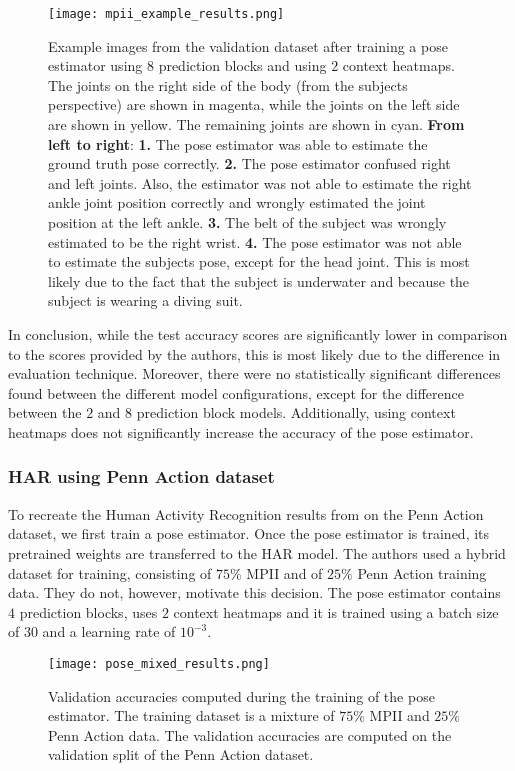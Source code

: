 \begin{figure}[htb!]
    \centering
    \texttt{[image: mpii\_example\_results.png]}
    \caption{Example images from the validation dataset after training a pose estimator using $8$ prediction blocks and using $2$ context heatmaps. The joints on the right side of the body (from the subjects perspective) are shown in magenta, while the joints on the left side are shown in yellow. The remaining joints are shown in cyan. \textbf{From left to right}: \textbf{1.} The pose estimator was able to estimate the ground truth pose correctly. \textbf{2.} The pose estimator confused right and left joints. Also, the estimator was not able to estimate the right ankle joint position correctly and wrongly estimated the joint position at the left ankle. \textbf{3.} The belt of the subject was wrongly estimated to be the right wrist. \textbf{4.} The pose estimator was not able to estimate the subjects pose, except for the head joint. This is most likely due to the fact that the subject is underwater and because the subject is wearing a diving suit.}
    \label{fig:mpii_example_results}
\end{figure}
In conclusion, while the test accuracy scores are significantly lower in comparison to the scores provided by the authors, this is most likely due to the difference in evaluation technique.
Moreover, there were no statistically significant differences found between the different model configurations, except for the difference between the $2$ and $8$ prediction block models.
Additionally, using context heatmaps does not significantly increase the accuracy of the pose estimator.

\subsubsection{HAR using Penn Action dataset}
\label{sec:exp-har-pennaction}
To recreate the Human Activity Recognition results from \cite{luvizon_2d/3d_2018} on the Penn Action dataset, we first train a pose estimator.
Once the pose estimator is trained, its pretrained weights are transferred to the HAR model.
The authors used a hybrid dataset for training, consisting of $75\%$ MPII and of $25\%$ Penn Action training data.
They do not, however, motivate this decision.
The pose estimator contains $4$ prediction blocks, uses $2$ context heatmaps and it is trained using a batch size of $30$ and a learning rate of $10^{-3}$.

\begin{figure}[htb!]
    \centering
    \texttt{[image: pose\_mixed\_results.png]}
    \caption{Validation accuracies computed during the training of the pose estimator. The training dataset is a mixture of $75\%$ MPII and $25\%$ Penn Action data. The validation accuracies are computed on the validation split of the Penn Action dataset. }
    \label{fig:pose_mixed_results}
\end{figure}

